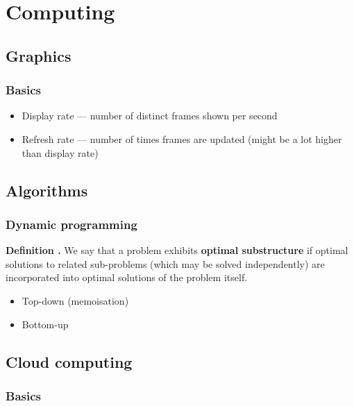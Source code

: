 \chapter{Computing}

\section{Graphics}

\subsection{Basics}

\begin{itemize}
	\item Display rate --- number of distinct frames shown per second
	\item Refresh rate --- number of times frames are updated (might be a lot higher than display rate)
\end{itemize}

\section{Algorithms}
\subsection{Dynamic programming}

\begin{shaded}
\textbf{Definition \cite{clrs_algorithms}.} We say that a problem exhibits \textbf{optimal substructure} if optimal solutions to related sub-problems (which may be solved independently) are incorporated into optimal solutions of the problem itself.
\end{shaded}

\begin{itemize}
	\item Top-down (memoisation)
	\item Bottom-up
\end{itemize}

\section{Cloud computing}

\subsection{Basics}

